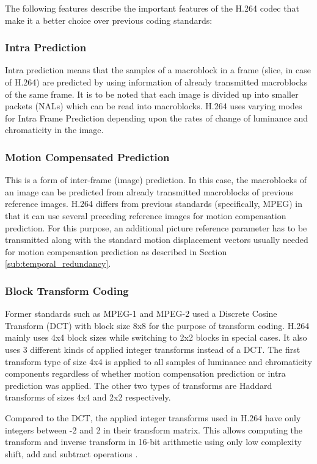 \documentclass[letterpaper,12pt,titlepage,oneside,final]{report}
\begin{document}
            The following features describe the important features of the H.264 codec that make it a better choice over previous coding standards:
            \subsubsection {Intra Prediction}
                Intra prediction means that the samples of a macroblock in a frame (slice, in case of H.264) are predicted by using information of already transmitted macroblocks of the same frame. It is to be noted that each image is divided up into smaller packets (NALs) which can be read into macroblocks. H.264 uses varying modes for Intra Frame Prediction depending upon the rates of change of luminance and chromaticity in the image. 

            \subsubsection {Motion Compensated Prediction}
                This is a form of inter-frame (image) prediction. In this case, the macroblocks of an image can be predicted from already transmitted macroblocks of previous reference images. H.264 differs from previous standards (specifically, MPEG) in that it can use several preceding reference images for motion compensation prediction. For this purpose, an additional picture reference parameter has to be transmitted along with the standard motion displacement vectors usually needed for motion compensation prediction as described in Section \ref{sub:temporal_redundancy}.

            \subsubsection {Block Transform Coding}
                Former standards such as MPEG-1 and MPEG-2 used a Discrete Cosine Transform (DCT) with block size 8x8 for the purpose of transform coding. H.264 mainly uses 4x4 block sizes while switching to 2x2 blocks in special cases. It also uses 3 different kinds of applied integer transforms instead of a DCT. The first transform type of size 4x4 is applied to all samples of luminance and chromaticity components regardless of whether motion compensation prediction or intra prediction was applied. The other two types of transforms are Haddard transforms of sizes 4x4 and 2x2 respectively. 

                Compared to the DCT, the applied integer transforms used in H.264 have only integers between -2 and 2 in their transform matrix. This allows computing the transform and inverse transform in 16-bit arithmetic using only low complexity shift, add and subtract operations \cite{Ostermann2004}.
\end{document}
